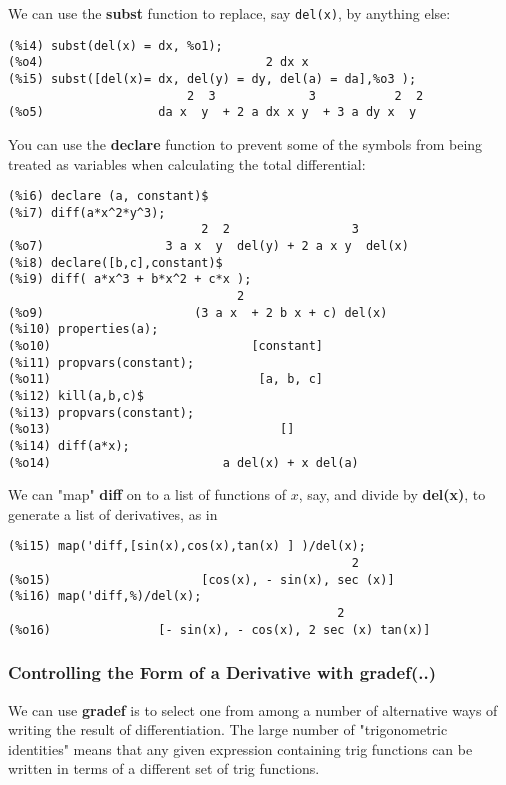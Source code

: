 \documentclass[12pt]{article}
\begin{document}
We can use the \textbf{subst} function to replace, say \verb|del(x)|, by anything else:
\small
\begin{verbatim}
(%i4) subst(del(x) = dx, %o1);
(%o4)                               2 dx x
(%i5) subst([del(x)= dx, del(y) = dy, del(a) = da],%o3 );
                         2  3             3           2  2
(%o5)                da x  y  + 2 a dx x y  + 3 a dy x  y
\end{verbatim}
\normalsize
You can use the \textbf{declare} function to prevent some of the symbols from
  being treated as variables when calculating the total differential:
\small
\begin{verbatim}
(%i6) declare (a, constant)$
(%i7) diff(a*x^2*y^3);
                           2  2                 3
(%o7)                 3 a x  y  del(y) + 2 a x y  del(x)
(%i8) declare([b,c],constant)$
(%i9) diff( a*x^3 + b*x^2 + c*x );
                                2
(%o9)                     (3 a x  + 2 b x + c) del(x)
(%i10) properties(a);
(%o10)                            [constant]
(%i11) propvars(constant);
(%o11)                             [a, b, c]
(%i12) kill(a,b,c)$
(%i13) propvars(constant);
(%o13)                                []
(%i14) diff(a*x);
(%o14)                        a del(x) + x del(a)
\end{verbatim}
\normalsize
We can "map" \textbf{diff} on to a list of functions of $x$, say, and divide by \textbf{del(x)},
  to generate a list of derivatives, as in
\small
\begin{verbatim}
(%i15) map('diff,[sin(x),cos(x),tan(x) ] )/del(x);
                                                2
(%o15)                     [cos(x), - sin(x), sec (x)]
(%i16) map('diff,%)/del(x);
                                              2
(%o16)               [- sin(x), - cos(x), 2 sec (x) tan(x)]
\end{verbatim}
\normalsize

  
\subsubsection{Controlling the Form of a Derivative with gradef(..)}

We can use \textbf{gradef} is to select one from among a number of
  alternative ways of writing the result of differentiation.
The large number of "trigonometric identities" means that any given expression
  containing trig functions can be written in terms of a different set of
  trig functions.
\end{document}
